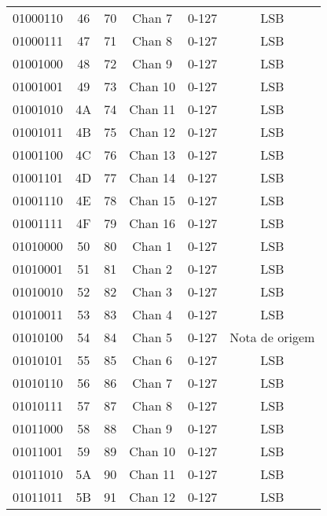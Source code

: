 \begin{center}
\begin{supertabular}{| c | c | c | c | c | c |}
             01000110 & 46 & 70  & Chan 7   & 0-127 & LSB \\
                01000111 & 47 & 71  & Chan 8   & 0-127 & LSB \\
             01001000 & 48 & 72  & Chan 9   & 0-127 & LSB \\
                01001001 & 49 & 73  & Chan 10  & 0-127 & LSB \\
             01001010 & 4A & 74  & Chan 11  & 0-127 & LSB \\
                01001011 & 4B & 75  & Chan 12  & 0-127 & LSB \\
             01001100 & 4C & 76  & Chan 13  & 0-127 & LSB \\
                01001101 & 4D & 77  & Chan 14  & 0-127 & LSB \\
             01001110 & 4E & 78  & Chan 15  & 0-127 & LSB \\
                01001111 & 4F & 79  & Chan 16  & 0-127 & LSB \\
             01010000 & 50 & 80  & Chan 1   & 0-127 & LSB \\
                01010001 & 51 & 81  & Chan 2   & 0-127 & LSB \\
             01010010 & 52 & 82  & Chan 3   & 0-127 & LSB \\
                01010011 & 53 & 83  & Chan 4   & 0-127 & LSB \\
             01010100 & 54 & 84  & Chan 5   & 0-127 & Nota de origem \\
                01010101 & 55 & 85  & Chan 6   & 0-127 & LSB \\
             01010110 & 56 & 86  & Chan 7   & 0-127 & LSB \\
                01010111 & 57 & 87  & Chan 8   & 0-127 & LSB \\
             01011000 & 58 & 88  & Chan 9   & 0-127 & LSB \\
                01011001 & 59 & 89  & Chan 10  & 0-127 & LSB \\
             01011010 & 5A & 90  & Chan 11  & 0-127 & LSB \\
                01011011 & 5B & 91  & Chan 12  & 0-127 & LSB \\

\end{supertabular}
\end{center}
